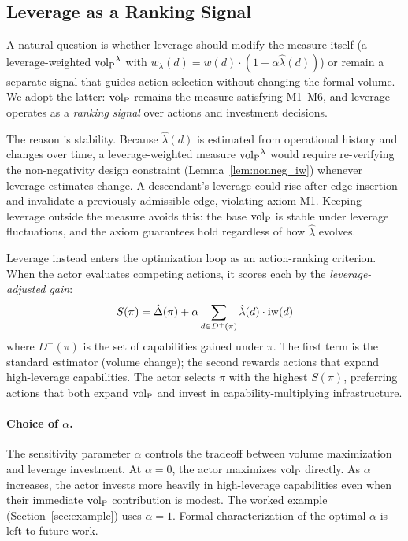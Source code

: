 \subsection{Leverage as a Ranking Signal}
\label{sec:leverage_measure}

A natural question is whether leverage should modify the measure itself (a
leverage-weighted ${\operatorname{vol}_{\mathrm{P}}}^\lambda$ with $w_\lambda(d) = w(d) \cdot (1 + \alpha
\hat{\lambda}(d))$) or remain a separate signal that guides action selection
without changing the formal volume. We adopt the latter: ${\operatorname{vol}_{\mathrm{P}}}$ remains the
measure satisfying M1--M6, and leverage operates as a \emph{ranking signal}
over actions and investment decisions.

The reason is stability. Because $\hat{\lambda}(d)$ is estimated from
operational history and changes over time, a leverage-weighted measure
${\operatorname{vol}_{\mathrm{P}}}^\lambda$ would require re-verifying the non-negativity design
constraint (Lemma~\ref{lem:nonneg_iw}) whenever leverage estimates change.
A descendant's leverage could rise after edge insertion and invalidate a
previously admissible edge, violating axiom M1. Keeping leverage outside the
measure avoids this: the base ${\operatorname{vol}_{\mathrm{P}}}$ is stable under leverage fluctuations,
and the axiom guarantees hold regardless of how $\hat{\lambda}$ evolves.

Leverage instead enters the optimization loop as an action-ranking criterion.
When the actor evaluates competing actions, it scores each by the
\emph{leverage-adjusted gain}:
\begin{equation}
\label{eq:leverage_score}
S(\pi) = \hat{\Delta}(\pi) + \alpha \sum_{d \in D^+(\pi)} \hat{\lambda}(d) \cdot \operatorname{iw}(d)
\end{equation}
where $D^+(\pi)$ is the set of capabilities gained under $\pi$. The first term
is the standard estimator (volume change); the second rewards actions that
expand high-leverage capabilities. The actor selects $\pi$ with the highest
$S(\pi)$, preferring actions that both expand ${\operatorname{vol}_{\mathrm{P}}}$ and invest in
capability-multiplying infrastructure.

\paragraph{Choice of $\alpha$.} The sensitivity parameter $\alpha$ controls
the tradeoff between volume maximization and leverage investment.
At $\alpha = 0$, the actor maximizes ${\operatorname{vol}_{\mathrm{P}}}$ directly. As $\alpha$ increases,
the actor invests more heavily in high-leverage capabilities even when their
immediate ${\operatorname{vol}_{\mathrm{P}}}$ contribution is modest. The worked example
(Section~\ref{sec:example}) uses $\alpha = 1$.
Formal characterization of the optimal $\alpha$ is left to future work.

